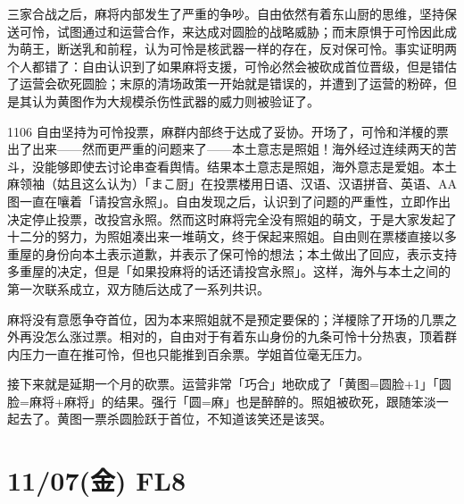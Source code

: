 
三家合战之后，麻将内部发生了严重的争吵。自由依然有着东山厨的思维，坚持保送可怜，试图通过和运营合作，来达成对圆脸的战略威胁；而末原惧于可怜因此成为萌王，断送乳和前程，认为可怜是核武器一样的存在，反对保可怜。事实证明两个人都错了：自由认识到了如果麻将支援，可怜必然会被砍成首位晋级，但是错估了运营会砍死圆脸；末原的清场政策一开始就是错误的，并遭到了运营的粉碎，但是其认为黄图作为大规模杀伤性武器的威力则被验证了。

1106 自由坚持为可怜投票，麻群内部终于达成了妥协。开场了，可怜和洋榎的票出了出来——然而更严重的问题来了——本土意志是照姐！海外经过连续两天的苦斗，没能够即使去讨论串查看舆情。结果本土意志是照姐，海外意志是爱姐。本土麻领袖（姑且这么认为）「まこ厨」在投票楼用日语、汉语、汉语拼音、英语、AA图一直在嚷着「请投宫永照」。自由发现之后，认识到了问题的严重性，立即作出决定停止投票，改投宫永照。然而这时麻将完全没有照姐的萌文，于是大家发起了十二分的努力，为照姐凑出来一堆萌文，终于保起来照姐。自由则在票楼直接以多重屋的身份向本土表示道歉，并表示了保可怜的想法；本土做出了回应，表示支持多重屋的决定，但是「如果投麻将的话还请投宫永照」。这样，海外与本土之间的第一次联系成立，双方随后达成了一系列共识。

麻将没有意愿争夺首位，因为本来照姐就不是预定要保的；洋榎除了开场的几票之外再没怎么涨过票。相对的，自由对于有着东山身份的九条可怜十分热衷，顶着群内压力一直在推可怜，但也只能推到百余票。学姐首位毫无压力。

接下来就是延期一个月的砍票。运营非常「巧合」地砍成了「黄图=圆脸+1」「圆脸=麻将+麻将」的结果。强行「圆=麻」也是醉醉的。照姐被砍死，跟随笨淡一起去了。黄图一票杀圆脸跃于首位，不知道该笑还是该哭。

\section{11/07(金) FL8}

